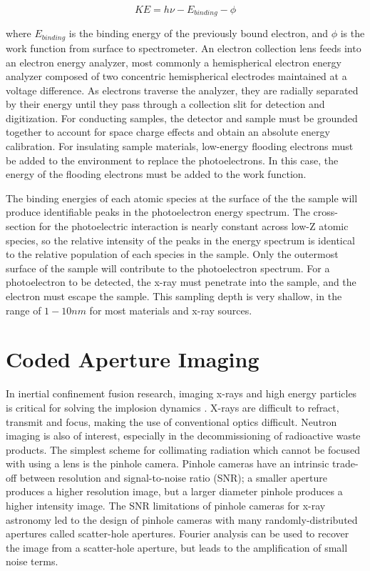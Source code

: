 \documentclass{jpp}
\begin{document}
\begin{equation*}
KE = h \nu - E_{binding} - \phi
\end{equation*}

where $E_{binding}$ is the binding energy of the previously bound electron, and $\phi$ is the work function from surface to spectrometer. An electron collection lens feeds into an electron energy analyzer, most commonly a hemispherical electron energy analyzer composed of two concentric hemispherical electrodes maintained at a voltage difference. As electrons traverse the analyzer, they are radially separated by their energy until they pass through a collection slit for detection and digitization. For conducting samples, the detector and sample must be grounded together to account for space charge effects and obtain an absolute energy calibration. For insulating sample materials, low-energy flooding electrons must be added to the environment to replace the photoelectrons. In this case, the energy of the flooding electrons must be added to the work function.

The binding energies of each atomic species at the surface of the the sample will produce identifiable peaks in the photoelectron energy spectrum. The cross-section for the photoelectric interaction is nearly constant across low-Z atomic species, so the relative intensity of the peaks in the energy spectrum is identical to the relative population of each species in the sample. Only the outermost surface of the sample will contribute to the photoelectron spectrum. For a photoelectron to be detected, the x-ray must penetrate into the sample, and the electron must escape the sample. This sampling depth is very shallow, in the range of $1-10nm$ for most materials and x-ray sources.

\section{Coded Aperture Imaging}

In inertial confinement fusion research, imaging x-rays and high energy particles is critical for solving the implosion dynamics \citep{Niki1983}. X-rays are difficult to refract, transmit and focus, making the use of conventional optics difficult. Neutron imaging is also of interest, especially in the decommissioning of radioactive waste products. The simplest scheme for collimating radiation which cannot be focused with using a lens is the pinhole camera. Pinhole cameras have an intrinsic trade-off between resolution and signal-to-noise ratio (SNR); a smaller aperture produces a higher resolution image, but a larger diameter pinhole produces a higher intensity image. The SNR limitations of pinhole cameras for x-ray astronomy led to the design of pinhole cameras with many randomly-distributed apertures called scatter-hole apertures. Fourier analysis can be used to recover the image from a scatter-hole aperture, but leads to the amplification of small noise terms.
\end{document}

